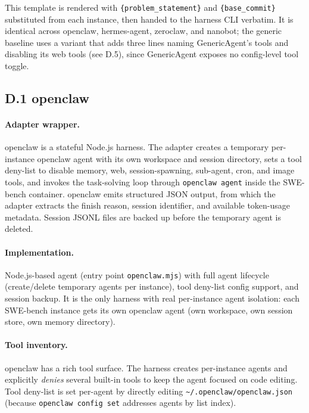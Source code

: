 This template is rendered with \texttt{\{problem\_statement\}} and \texttt{\{base\_commit\}} substituted from each instance, then handed to the harness CLI verbatim. It is identical across openclaw, hermes-agent, zeroclaw, and nanobot; the generic baseline uses a variant that adds three lines naming GenericAgent's tools and disabling its web tools (see D.5), since GenericAgent exposes no config-level tool toggle.

\subsection*{D.1 openclaw}

\paragraph{Adapter wrapper.}
openclaw is a stateful Node.js harness. The adapter creates a temporary per-instance openclaw agent with its own workspace and session directory, sets a tool deny-list to disable memory, web, session-spawning, sub-agent, cron, and image tools, and invokes the task-solving loop through \texttt{openclaw agent} inside the SWE-bench container. openclaw emits structured JSON output, from which the adapter extracts the finish reason, session identifier, and available token-usage metadata. Session JSONL files are backed up before the temporary agent is deleted.


\paragraph{Implementation.}
Node.js-based agent (entry point \texttt{openclaw.mjs}) with full agent lifecycle (create/delete temporary agents per instance), tool deny-list config support, and session backup. It is the only harness with real per-instance agent isolation: each SWE-bench instance gets its own openclaw agent (own workspace, own session store, own memory directory).

\paragraph{Tool inventory.}
openclaw has a rich tool surface. The harness creates per-instance agents and explicitly \emph{denies} several built-in tools to keep the agent focused on code editing. Tool deny-list is set per-agent by directly editing \texttt{\textasciitilde/.openclaw/openclaw.json} (because \texttt{openclaw config set} addresses agents by list index).

